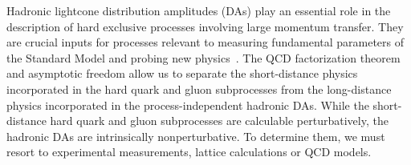 
Hadronic lightcone distribution amplitudes (DAs) play an essential role in the description of hard exclusive processes involving large momentum transfer. They are crucial inputs for processes relevant to measuring fundamental parameters of the Standard Model and probing new physics~\cite{Stewart:2003gt}. The QCD factorization theorem and asymptotic freedom allow us to separate the short-distance physics incorporated in the hard quark and gluon subprocesses from the long-distance physics incorporated in the process-independent hadronic DAs. 
While the short-distance hard quark and gluon subprocesses are calculable perturbatively, the hadronic DAs are intrinsically nonperturbative. To determine them, 
we must resort to experimental measurements, lattice calculations or QCD models. 

